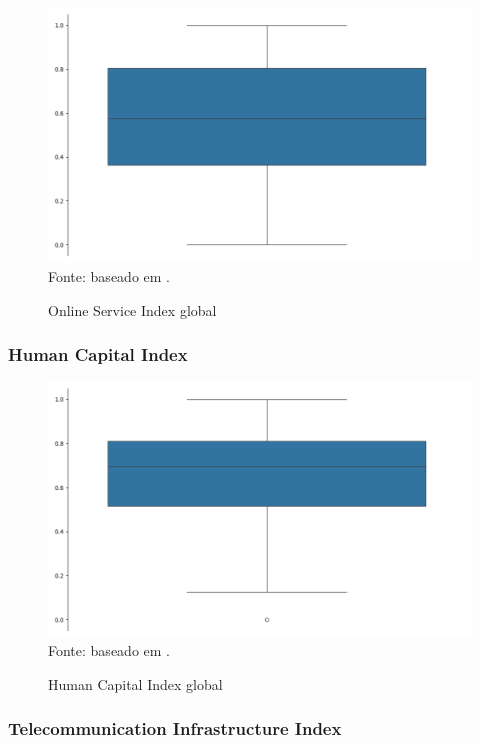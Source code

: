 \begin{figure}[H]
	\centering
	\caption{Online Service Index global}
	\includegraphics[width=1\linewidth]{figuras/egdi/boxplot_osi_global.png}
	\label{fig:boxplot_osi_global}
	\footnotesize{Fonte: baseado em \cite{ONU_edgi_mapa}.}
\end{figure}

\subsubsection{Human Capital Index}
\label{hci}

\begin{figure}[H]
	\centering
	\caption{Human Capital Index global}
	\includegraphics[width=1\linewidth]{figuras/egdi/boxplot_hci_global.png}
	\label{fig:boxplot_hci_global}
	\footnotesize{Fonte: baseado em \cite{ONU_edgi_mapa}.}
\end{figure}

\subsubsection{Telecommunication Infrastructure Index}
\label{tii}

